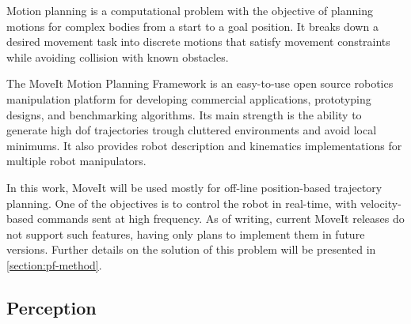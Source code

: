 
\par Motion planning is a computational problem with the objective of planning motions for complex bodies from a start to a goal position. It breaks down a desired movement task into discrete motions that satisfy movement constraints while avoiding collision with known obstacles. 
\par The MoveIt Motion Planning Framework \cite{moveit.paper, moveit.online} is an easy-to-use open source robotics manipulation platform for developing commercial applications, prototyping designs, and benchmarking algorithms. Its main strength is the ability to generate high \ac{dof} trajectories trough cluttered environments and avoid local minimums. It also provides robot description and kinematics implementations for multiple robot manipulators. 
\par In this work, MoveIt will be used mostly for off-line position-based trajectory planning. One of the objectives is to control the robot in real-time, with velocity-based commands sent at high frequency. As of writing, current MoveIt releases do not support such features, having only plans to implement them in future versions. Further details on the solution of this problem will be presented in \autoref{section:pf-method}.


\subsection{Perception}


